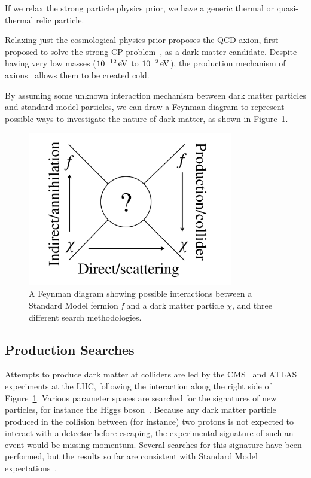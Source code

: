 If we relax the strong particle physics prior, we have a generic thermal or quasi-thermal relic particle.

Relaxing just the cosmological physics prior proposes the QCD axion, first proposed to solve the strong CP problem~\cite{Peccei:1977,Weinberg:1978,Wilczek:1978}, as a dark matter candidate. Despite having very low masses ($10^{-12}\,\mathrm{eV}$ to $10^{-2}\,\mathrm{eV}$), the production mechanism of axions~\cite{Preskill:1983,Abbott:1983,Dine:1983} allows them to be created cold.

By assuming some unknown interaction mechanism between dark matter particles and standard model particles, we can draw a Feynman diagram to represent possible ways to investigate the nature of dark matter, as shown in Figure~\ref{fig:feynman}.

\begin{figure}[htb]
    \centering
    \includegraphics[width=0.8\textwidth]{figures/dm/feynman_diag}
    \caption{A Feynman diagram showing possible interactions between a Standard Model fermion \textit{f} and a dark matter particle $\chi$, and three different search methodologies.}\label{fig:feynman}
\end{figure}

\subsection{Production Searches}

Attempts to produce dark matter at colliders are led by the CMS~\cite{cms:2008} and ATLAS~\cite{atlas:2008} experiments at the LHC, following the interaction along the right side of Figure~\ref{fig:feynman}. Various parameter spaces are searched for the signatures of new particles, for instance the Higgs boson~\cite{cms:2012,atlas:2012}. Because any dark matter particle produced in the collision between (for instance) two protons is not expected to interact with a detector before escaping, the experimental signature of such an event would be missing momentum. Several searches for this signature have been performed, but the results so far are consistent with Standard Model expectations~\cite{atlas:2016,cms:2017}.

